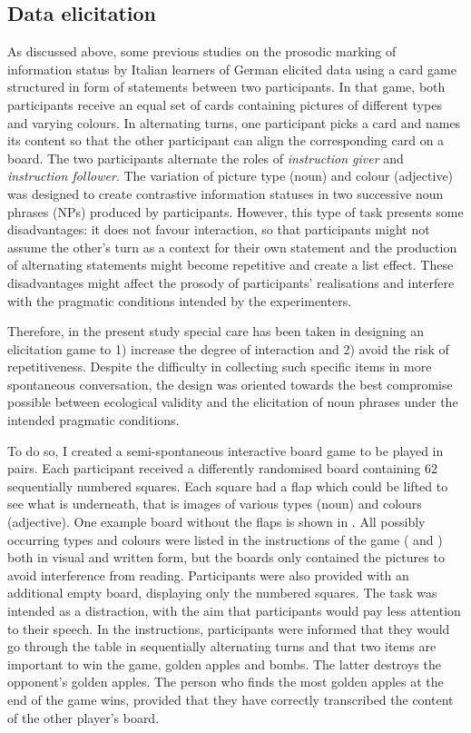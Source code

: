 \subsection{Data elicitation}
\label{sec:2.2.1}
As discussed above, some previous studies on the prosodic marking of information status by Italian learners of German elicited data using a card game structured in form of statements between two participants. In that game, both participants receive an equal set of cards containing pictures of different types and varying colours. In alternating turns, one participant picks a card and names its content so that the other participant can align the corresponding card on a board. The two participants alternate the roles of \textit{instruction giver} and \textit{instruction follower}. The variation of picture type (noun) and colour (adjective) was designed to create contrastive information statuses in two successive noun phrases (NPs) produced by participants. However, this type of task presents some disadvantages: it does not favour interaction, so that participants might not assume the other’s turn as a context for their own statement and the production of alternating statements might become repetitive and create a list effect. These disadvantages might affect the prosody of participants’ realisations and interfere with the pragmatic conditions intended by the experimenters.

Therefore, in the present study special care has been taken in designing an elicitation game to 1) increase the degree of interaction and 2) avoid the risk of repetitiveness. Despite the difficulty in collecting such specific items in more spontaneous conversation, the design was oriented towards the best compromise possible between ecological validity and the elicitation of noun phrases under the intended pragmatic conditions.

To do so, I created a semi-spontaneous interactive board game to be played in pairs. Each participant received a differently randomised board containing 62 sequentially numbered squares. Each square had a flap which could be lifted to see what is underneath, that is images of various types (noun) and colours (adjective). One example board without the flaps is shown in . All possibly occurring types and colours were listed in the instructions of the game ( and ) both in visual and written form, but the boards only contained the pictures to avoid interference from reading. Participants were also provided with an additional empty board, displaying only the numbered squares. The task was intended as a distraction, with the aim that participants would pay less attention to their speech. In the instructions, participants were informed that they would go through the table in sequentially alternating turns and that two items are important to win the game, golden apples and bombs. The latter destroys the opponent’s golden apples. The person who finds the most golden apples at the end of the game wins, provided that they have correctly transcribed the content of the other player’s board.

